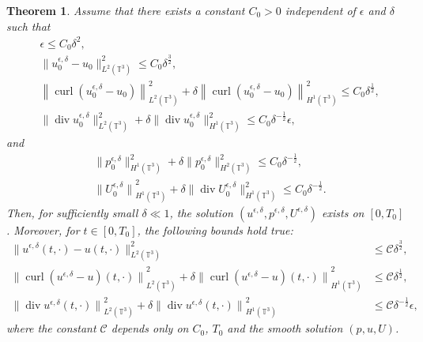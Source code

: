 \documentclass[reqno,10pt]{amsart}
\newtheorem{theorem}{Theorem}[section]
\theoremstyle{definition}
\theoremstyle{remark}
\numberwithin{equation}{section}
\DeclareMathOperator{\dive}{div}
\DeclareMathOperator{\curl}{curl}
\begin{document}
\begin{theorem} \label{thm:critical_3d}
 Assume that there exists a constant $C_0>0$ independent of $\epsilon$ and $\delta$ such that
\begin{subequations}\label{ass1}
\begin{align}
    &\epsilon \le C_0 \delta^2, \\
    &\|u^{\epsilon,\delta}_0 - u_0\|_{L^2(\mathbb T^3)}^2 \le C_0\delta^{\frac{3}{2}}, \\
    &\left\|\curl\left(u^{\epsilon,\delta}_0 - u_0\right)\right\|_{L^2(\mathbb T^3)}^2 + \delta\left\|\curl\left(u^{\epsilon,\delta}_0 - u_0\right)\right\|_{H^1(\mathbb T^3)}^2 \le C_0\delta^{\frac{1}{2}}, \label{eq:ass1_c}\\
    &\|\dive u^{\epsilon,\delta}_0\|_{L^2(\mathbb T^3)}^2 + \delta \|\dive u^{\epsilon,\delta}_0\|_{H^1(\mathbb T^3)}^2 \le C_0\delta^{-\frac{1}{2}}\epsilon,
\end{align}
\end{subequations}
and
\begin{subequations}\label{ass2}
\begin{align}
    &\|p^{\epsilon,\delta}_0\|_{H^1(\mathbb T^3)}^2 + \delta\|p^{\epsilon,\delta}_0\|_{H^2(\mathbb T^3)}^2 \le C_0\delta^{-\frac{1}{2}}, \\
    &{\|U^{\epsilon,\delta}_0\|}_{H^1(\mathbb T^3)}^2 + \delta \|\dive U^{\epsilon,\delta}_0\|_{H^1(\mathbb T^3)}^2 \le C_0\delta^{-\frac{1}{2}}. \label{eq:ass2_b} %
\end{align}
\end{subequations}   
Then, for sufficiently small $\delta\ll 1$, the solution $(u^{\epsilon,\delta},p^{\epsilon,\delta},U^{\epsilon,\delta})$ exists on $[0,T_0]$. Moreover, for $t\in[0,T_0]$, the following bounds hold true:
    \begin{subequations} \label{eq:bounds_critical}
    \begin{align}
        \|u^{\epsilon,\delta}(t,\cdot)-u(t,\cdot)\|_{L^2(\mathbb T^3)}^2&\le \mathcal C\delta^{\frac{3}{2}}, \label{eq:bounds_critical_u} \\
        {\|\curl (u^{\epsilon,\delta}-u)(t,\cdot)\|}_{L^2(\mathbb T^3)}^2 + \delta {\|\curl (u^{\epsilon,\delta}-u)(t,\cdot)\|}_{H^1(\mathbb T^3)}^2  &\le \mathcal C\delta^{\frac{1}{2}}, \label{eq:bounds_critical_curl} \\
        {\|\dive u^{\epsilon,\delta}(t,\cdot)\|}_{L^2(\mathbb T^3)}^2 + \delta {\|\dive u^{\epsilon,\delta}(t,\cdot)\|}_{H^1(\mathbb T^3)}^2 &\le \mathcal C\delta^{-\frac{1}{2}}\epsilon, \label{eq:bounds_critical_div}
    \end{align}
    \end{subequations}
where the constant $\mathcal C$ depends only on $C_0$, $T_0$ and the smooth solution $(p,u,U)$.
\end{theorem}
\end{document}
